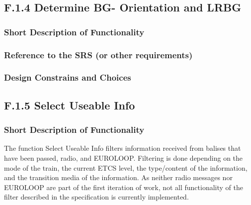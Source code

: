 \documentclass{template/openetcs_report}
\begin{document}


\subsection{F.1.4 Determine BG- Orientation and LRBG}

\subsubsection{Short Description of Functionality}
\subsubsection{Reference to the SRS (or other requirements)}
\subsubsection{Design Constrains and Choices}


\subsection{F.1.5 Select Useable Info}

\subsubsection{Short Description of Functionality}
The function Select Useable Info filters information received from balises that have been passed, radio, and EUROLOOP. Filtering is done depending on the mode of the train, the current ETCS level, the type/content of the information, and the transition media of the information. As neither radio messages nor EUROLOOP are part of the first iteration of work, not all functionality of the filter described in the specification is currently implemented.
\end{document}
